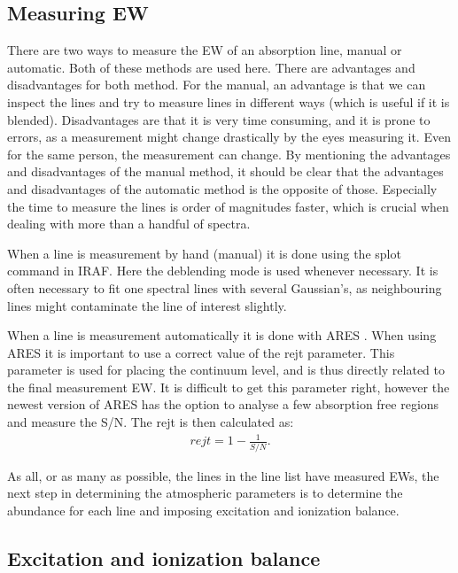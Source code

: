 \subsection{Measuring EW}
\label{sec:measureEW}

There are two ways to measure the EW of an absorption line, manual or automatic.
Both of these methods are used here. There are advantages and disadvantages for
both method. For the manual, an advantage is that we can inspect the lines and
try to measure lines in different ways (which is useful if it is blended).
Disadvantages are that it is very time consuming, and it is prone to errors, as
a measurement might change drastically by the eyes measuring it. Even for the
same person, the measurement can change. By mentioning the advantages and
disadvantages of the manual method, it should be clear that the advantages and
disadvantages of the automatic method is the opposite of those. Especially the
time to measure the lines is order of magnitudes faster, which is crucial when
dealing with more than a handful of spectra.

When a line is measurement by hand (manual) it is done using the splot command
in IRAF. Here the deblending mode is used whenever necessary. It is often
necessary to fit one spectral lines with several Gaussian's, as neighbouring
lines might contaminate the line of interest slightly.

When a line is measurement automatically it is done with ARES
\citep{Sousa2007,Sousa2015a}. When using ARES it is important to use a correct
value of the rejt parameter. This parameter is used for placing the continuum
level, and is thus directly related to the final measurement EW. It is difficult
to get this parameter right, however the newest version of ARES has the option
to analyse a few absorption free regions and measure the S/N. The rejt is then
calculated as:
\begin{align*}
  rejt = 1 - \frac{1}{S/N}.
\end{align*}

As all, or as many as possible, the lines in the line list have measured EWs,
the next step in determining the atmospheric parameters is to determine the
abundance for each line and imposing excitation and ionization balance.


\subsection{Excitation and ionization balance}

